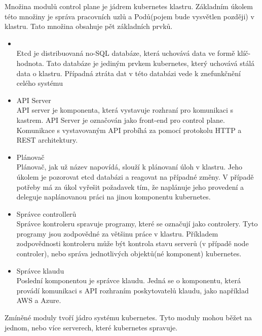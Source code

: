 Množina modulů control plane je jádrem kubernetes klastru. Základním úkolem této množiny je správa pracovních uzlů a Podů(pojem bude vysvětlen později) v klastru.\cite{thekubernetesauthors_2022_kubernetes} Tato množina obsahuje pět základních prvků.
\begin{itemize}
    \item {}\\
    Etcd je distribuovaná no-SQL databáze, která uchovává data  ve formě klíč-hodnota. Tato databáze je jediným prvkem kubernetes, který uchovává stálá data o klastru. Případná ztráta dat v této databázi vede k znefunkčnění celého systému
    \item API Server\\
    API server je komponenta, která vystavuje rozhraní pro komunikaci s kastrem. API Server je označován jako front-end pro control plane. Komunikace s vystavovaným API probíhá za pomocí protokolu HTTP a REST architektury. 
    \item Plánovač\\
    Plánovač, jak už název napovídá, slouží k plánovaní úloh v klastru. Jeho úkolem je pozorovat etcd databázi a reagovat na případné změny. V případě potřeby má za úkol vyřešit požadavek tím, že naplánuje jeho provedení a deleguje naplánovanou práci na jinou komponentu kubernetes.  
    \item Správce controllerů\\
    Správce kontroleru spravuje programy, které se označují jako controlery. Tyto programy jsou zodpovědné za většinu práce v klastru. Příkladem zodpovědnosti kontroleru může být kontrola stavu serverů (v případě node controler), nebo správa jednotlivých objektů(né komponent) kubernetes. 
    \item Správce klaudu\\
    Poslední komponentou je správce klaudu. Jedná se o komponentu, která provádí komunikaci s API rozhraním poskytovatelů klaudu, jako například AWS a Azure. 
\end{itemize}
Zmíněné moduly tvoří jádro systému kubernetes. Tyto moduly mohou běžet na jednom, nebo více serverech, které kubernetes spravuje.

